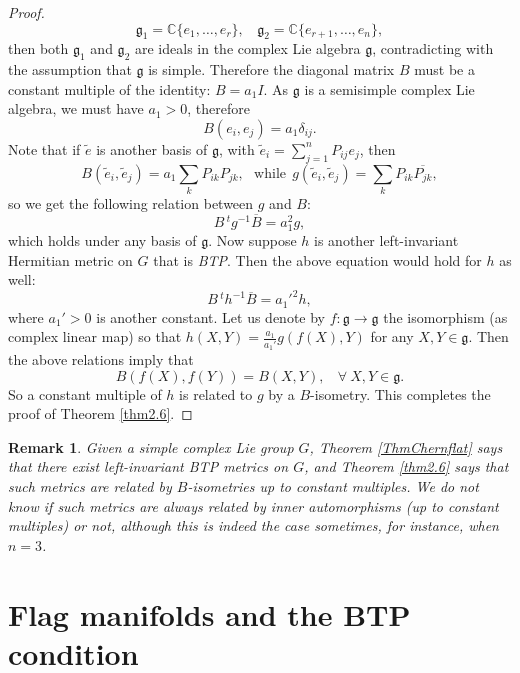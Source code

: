 \documentclass{amsart}
\numberwithin{equation}{section}
\newtheorem{remark}  [theorem]     {Remark}
\theoremstyle{definition}
\renewcommand{\1}{\mathds{1}}
\renewcommand{\>}{\rightarrow}
\begin{document}
\begin{proof}
$${\mathfrak g}_1={\mathbb C}\{ e_1, \ldots , e_r\}, \ \ \ \  {\mathfrak g}_2={\mathbb C}\{ e_{r+1}, \ldots , e_n\}, $$
then both ${\mathfrak g}_1$ and ${\mathfrak g}_2$ are ideals in the complex Lie algebra ${\mathfrak g}$, contradicting with the assumption that ${\mathfrak g}$ is simple. Therefore the diagonal matrix $B$ must be a constant multiple of the identity: $B=a_1I$.  As ${\mathfrak g}$ is a semisimple complex Lie algebra, we must have $a_1>0$, therefore
$$ B(e_i,e_j) =  a_1 \delta_{ij}. $$
Note that if  $\tilde{e}$ is another basis of ${\mathfrak g}$, with $\tilde{e}_i=\sum_{j=1}^nP_{ij}e_j$, then
$$ B(\tilde{e}_i,\tilde{e}_j) =  a_1 \sum_k P_{ik}P_{jk} , \ \ \ \mbox{while} \ \ g(\tilde{e}_i,\tilde{e}_j) = \sum_k P_{ik}\overline{P_{jk}} , $$
so we get the following relation between $g$ and $B$:
$$
B \,^t\!g^{-1} \overline{B} = a_1^2 g,
$$
which holds under any basis of ${\mathfrak g}$. Now suppose $h$ is another left-invariant Hermitian metric on $G$ that is {\em {\rm BTP}}. Then the above equation would hold for $h$ as well:
$$ B \,^t\!h^{-1} \overline{B} = a_1'^2h,$$
where $a_1'>0$ is another constant. Let us denote by $f: {\mathfrak g} \rightarrow {\mathfrak g}$ the isomorphism (as complex linear map) so that $h(X,Y)=\frac{a_1}{a_1'} g(f(X), Y)$ for any $X,Y \in {\mathfrak g}$. Then the above relations imply that
\begin{equation} \label{Bf}
 B(f(X), f(Y)) = B(X,Y) , \ \ \ \ \forall \ X, Y\in {\mathfrak g}.
\end{equation}
So a constant multiple of $h$ is related to $g$ by a $B$-isometry. This completes the proof of Theorem \ref{thm2.6}.
\end{proof}


\begin{remark}
Given a simple complex Lie group $G$, Theorem \ref{ThmChernflat} says that there exist left-invariant {\rm BTP} metrics on $G$, and Theorem \ref{thm2.6} says that such metrics are related by $B$-isometries up to constant multiples. We do not know if such metrics are always related by inner automorphisms (up to constant multiples) or not, although this is indeed the case sometimes, for instance, when $n=3$.
\end{remark}

\vspace{0.3cm}


\section{Flag manifolds and the {\rm BTP} condition}
\end{document}
